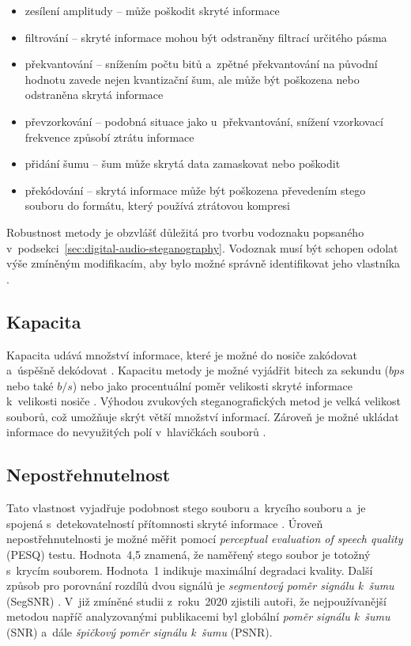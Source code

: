 \begin{itemize}
    \item zesílení amplitudy -- může poškodit skryté informace
    \item filtrování -- skryté informace mohou být odstraněny filtrací určitého
        pásma
    \item překvantování -- snížením počtu bitů a~zpětné překvantování na
        původní hodnotu zavede nejen kvantizační šum, ale může být poškozena
        nebo odstraněna skrytá informace
    \item převzorkování -- podobná situace jako u~překvantování, snížení
        vzorkovací frekvence způsobí ztrátu informace
    \item přidání šumu -- šum může skrytá data zamaskovat nebo poškodit
    \item překódování -- skrytá informace může být poškozena převedením stego
        souboru do formátu, který používá ztrátovou kompresi
\end{itemize}

Robustnost metody je obzvlášť důležitá pro tvorbu vodoznaku popsaného
v~podsekci~\ref{sec:digital-audio-steganography}. Vodoznak musí být schopen
odolat výše zmíněným modifikacím, aby bylo možné správně identifikovat jeho
vlastníka \cite{Swanson1998}.

\subsection*{Kapacita}
\label{sub:capacity}

Kapacita udává množství informace, které je možné do nosiče zakódovat a~úspěšně
dekódovat \cite{Dutta2020}\cite{Djebbar2012}. Kapacitu metody je možné vyjádřit
bitech za sekundu ($bps$ nebo také $b/s$) nebo jako procentuální poměr
velikosti skryté informace k~velikosti nosiče
\cite{AlSabhany2020}\cite{Dutta2020}. Výhodou zvukových steganografických metod
je velká velikost souborů, což umožňuje skrýt větší množství informací. Zároveň
je možné ukládat informace do nevyužitých polí v~hlavičkách souborů
\cite{Dutta2020}.

\subsection*{Nepostřehnutelnost}
\label{sub:imperceptibility}

Tato vlastnost vyjadřuje podobnost stego souboru a~krycího souboru a~je spojená
s~detekovatelností přítomnosti skryté informace \cite{AlSabhany2020}. Úroveň
nepostřehnutelnosti je možné měřit pomocí \textit{perceptual evaluation of
speech quality} (PESQ) testu. Hodnota~4,5 znamená, že naměřený stego soubor je
totožný s~krycím souborem. Hodnota~1 indikuje maximální degradaci kvality.
Další způsob pro porovnání rozdílů dvou signálů je \textit{segmentový poměr
signálu k~šumu} (SegSNR) \cite{Djebbar2012}. V~již zmíněné studii z~roku~2020
\cite{AlSabhany2020} zjistili autoři, že nejpoužívanější metodou napříč
analyzovanými publikacemi byl globální \textit{poměr signálu k~šumu} (SNR)
a~dále \textit{špičkový poměr signálu k~šumu} (PSNR).

